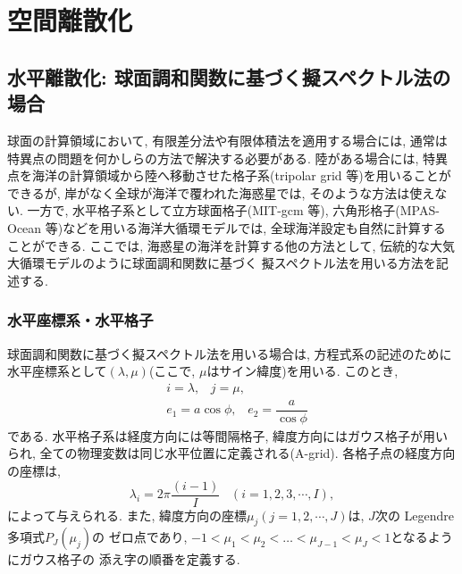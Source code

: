 \section{空間離散化}
\label{ocn_model_space_descretization}

\subsection{水平離散化: 球面調和関数に基づく擬スペクトル法の場合}
球面の計算領域において, 有限差分法や有限体積法を適用する場合には, 
通常は特異点の問題を何かしらの方法で解決する必要がある. 
陸がある場合には, 特異点を海洋の計算領域から陸へ移動させた格子系(tripolar grid 等)を用いることができるが, 
岸がなく全球が海洋で覆われた海惑星では, そのような方法は使えない. 
一方で, 水平格子系として立方球面格子(MIT-gcm 等), 六角形格子(MPAS-Ocean 等)などを用いる海洋大循環モデルでは,
全球海洋設定も自然に計算することができる.
ここでは, 海惑星の海洋を計算する他の方法として, 伝統的な大気大循環モデルのように球面調和関数に基づく
擬スペクトル法を用いる方法を記述する. 

\subsubsection*{水平座標系・水平格子}
球面調和関数に基づく擬スペクトル法を用いる場合は, 
方程式系の記述のために水平座標系として$(\lambda,\mu)$(ここで, $\mu$はサイン緯度)を用いる. 
このとき, 
\begin{align*}
  &i=\lambda, \;\;\; j = \mu, \\
  &e_1 = a\cos{\phi}, \;\;\;e_2 = \dfrac{a}{\cos{\phi}}
\end{align*}
である. 
水平格子系は経度方向には等間隔格子, 緯度方向にはガウス格子が用いられ, 
全ての物理変数は同じ水平位置に定義される(A-grid). 
各格子点の経度方向の座標は, 
$$
 \lambda_i = 2\pi \dfrac{(i-1)}{I} \;\;\;
  (i = 1, 2, 3, \cdots, I), 
$$
によって与えられる. 
また, 緯度方向の座標$\mu_j(j=1,2,\cdots,J)$は, $J$次の Legendre 多項式$P_J(\mu_j)$の
ゼロ点であり, $-1<\mu_1<\mu_2< \dots < \mu_{J-1} < \mu_J < 1$となるようにガウス格子の
添え字の順番を定義する. 

